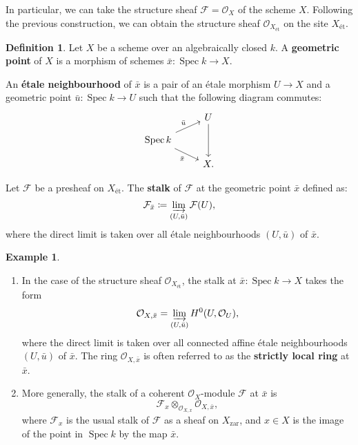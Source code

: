 \documentclass{report}
\DeclareMathOperator{\Spec}{Spec}
\theoremstyle{definition}
\newtheorem{definition}[theorem]{Definition}
\newtheorem{example}[theorem]{Example}
\begin{document}
In particular, we can take the structure sheaf $\mathcal{F}=\mathcal{O}_X$ of the scheme $X$. Following the previous construction, we can obtain the structure sheaf $\mathcal{O}_{X_{\text{\'{e}t}}}$ on the site $X_{\text{\'{e}t}}$.

\begin{definition}
Let $X$ be a scheme over an algebraically closed $k$. A \textbf{geometric point} of $X$ is a morphism of schemes $\bar{x}:\Spec k\rightarrow X$.

An \textbf{\'{e}tale neighbourhood} of $\bar{x}$ is a pair of an \'{e}tale morphism $U\rightarrow X$ and a geometric point $\bar{u}:\Spec k\rightarrow U$ such that the following diagram commutes:
\[
\begin{tikzcd}[row sep=small]
&U\arrow[dd]\\
\Spec k\arrow[ru,"\bar{u}"]\arrow[rd,swap,"\bar{x}"]\\
&X.
\end{tikzcd}
\]

Let $\mathcal{F}$ be a presheaf on $X_{\text{\'{e}t}}$. The \textbf{stalk} of $\mathcal{F}$ at the geometric point $\bar{x}$ defined as:
\[\mathcal{F}_{\bar{x}}\coloneqq\varinjlim_{(U,\bar{u})}\mathcal{F}(U),\]
where the direct limit is taken over all \'{e}tale neighbourhoods $(U,\bar{u})$ of $\bar{x}$.
\end{definition}

\begin{example}
\begin{enumerate}
\item In the case of the structure sheaf $\mathcal{O}_{X_{\text{\'{e}t}}}$, the stalk at $\bar{x}:\Spec k\rightarrow X$ takes the form
\[\mathcal{O}_{X,\bar{x}}=\varinjlim_{(U,\bar{u})}H^0(U,\mathcal{O}_U),\]
where the direct limit is taken over all connected affine \'{e}tale neighbourhoods $(U,\bar{u})$ of $\bar{x}$. The ring $\mathcal{O}_{X,\bar{x}}$ is often referred to as the \textbf{strictly local ring} at $\bar{x}$.
%

\item More generally, the stalk of a coherent $\mathcal{O}_X$-module $\mathcal{F}$ at $\bar{x}$ is
\[\mathcal{F}_x\otimes_{\mathcal{O}_{X,x}}\mathcal{O}_{X,\bar{x}},\]
where $\mathcal{F}_x$ is the usual stalk of $\mathcal{F}$ as a sheaf on $X_{\text{zar}}$, and $x\in X$ is the image of the point in $\Spec k$ by the map $\bar{x}$.
\end{enumerate}
\end{example}
%
\end{document}
